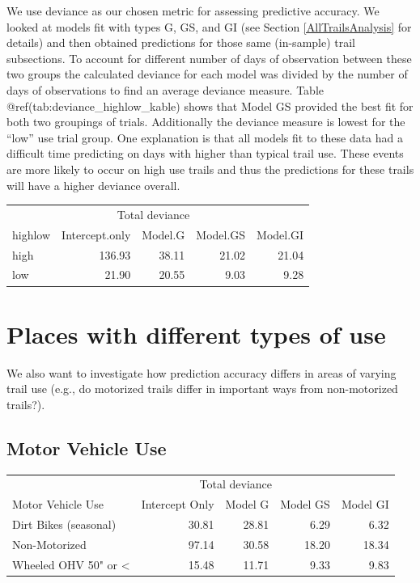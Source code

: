 \documentclass[
]{book}
\begin{document}
We use deviance as our chosen metric for assessing predictive accuracy. We looked at models fit with types G, GS, and GI (see Section \ref{AllTrailsAnalysis} for details) and then obtained predictions for those same (in-sample) trail subsections. To account for different number of days of observation between these two groups the calculated deviance for each model was divided by the number of days of observations to find an average deviance measure. Table @ref(tab:deviance\_highlow\_kable) shows that Model GS provided the best fit for both two groupings of trials. Additionally the deviance measure is lowest for the ``low'' use trial group. One explanation is that all models fit to these data had a difficult time predicting on days with higher than typical trail use. These events are more likely to occur on high use trails and thus the predictions for these trails will have a higher deviance overall.

\begin{table}
\centering
\begin{tabular}{lrrrr}
\toprule
\multicolumn{1}{c}{ } & \multicolumn{3}{c}{Total deviance} \\
\cmidrule(l{3pt}r{3pt}){2-4}
highlow & Intercept.only & Model.G & Model.GS & Model.GI\\
\midrule
high & 136.93 & 38.11 & 21.02 & 21.04\\
low & 21.90 & 20.55 & 9.03 & 9.28\\
\bottomrule
\end{tabular}
\end{table}

\hypertarget{places-with-different-types-of-use}{%
\section{Places with different types of use}\label{places-with-different-types-of-use}}

We also want to investigate how prediction accuracy differs in areas of varying trail use (e.g., do motorized trails differ in important ways from non-motorized trails?).

\hypertarget{motor-vehicle-use}{%
\subsection{Motor Vehicle Use}\label{motor-vehicle-use}}

\begin{table}
\centering
\begin{tabular}{lrrrr}
\toprule
\multicolumn{1}{c}{ } & \multicolumn{3}{c}{Total deviance} \\
\cmidrule(l{3pt}r{3pt}){2-4}
Motor Vehicle Use & Intercept Only & Model G & Model GS & Model GI\\
\midrule
Dirt Bikes (seasonal) & 30.81 & 28.81 & 6.29 & 6.32\\
Non-Motorized & 97.14 & 30.58 & 18.20 & 18.34\\
Wheeled OHV 50" or < & 15.48 & 11.71 & 9.33 & 9.83\\
\bottomrule
\end{tabular}
\end{table}
\end{document}
